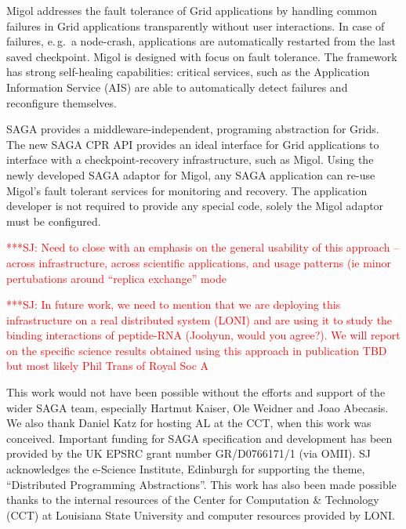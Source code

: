 \documentclass[times, 10pt,twocolumn]{article}
\newcommand{\jhanote}[1]{ {\textcolor{red} { ***SJ: #1 }}}
\newcommand{\jhanote}[1]{}
\begin{document}

Migol addresses the fault tolerance of Grid applications by handling
common failures in Grid applications transparently without user
interactions.  In case of failures, e.\,g.\ a node-crash, applications
are automatically restarted from the last saved checkpoint.  Migol is
designed with focus on fault tolerance.  The framework has strong
self-healing capabilities: critical services, such as the Application
Information Service (AIS) are able to automatically detect failures
and reconfigure themselves.

SAGA provides a middleware-independent, programing abstraction for
Grids. The new SAGA CPR API provides an ideal interface for Grid
applications to interface with a checkpoint-recovery infrastructure,
such as Migol. Using the newly developed SAGA adaptor for Migol, any
SAGA application can re-use Migol's fault tolerant services for
monitoring and recovery.  The application developer is not required to
provide any special code, solely the Migol adaptor must be configured.

\jhanote{Need to close with an emphasis on the general usability of
  this approach -- across infrastructure, across scientific
  applications, and usage patterns (ie minor pertubations around
  ``replica exchange'' mode}

\jhanote{In future work, we need to mention that we are deploying this
  infrastructure on a real distributed system (LONI) and are using it
  to study the binding interactions of peptide-RNA (Joohyun, would you
  agree?). We will report on the specific science results obtained
  using this approach in publication TBD but most likely Phil Trans of
  Royal Soc A}

This work would not have been possible without the efforts and support
of the wider SAGA team, especially Hartmut Kaiser, Ole Weidner and
Joao Abecasis. We also thank Daniel Katz for hosting AL at the CCT,
when this work was conceived.  Important funding for SAGA
specification and development has been provided by the UK EPSRC grant
number GR/D0766171/1 (via OMII).  SJ acknowledges the e-Science
Institute, Edinburgh for supporting the theme, ``Distributed
Programming Abstractions''.  This work has also been made possible
thanks to the internal resources of the Center for Computation \&
Technology (CCT) at Louisiana State University and computer resources
provided by LONI.  

\end{document}
